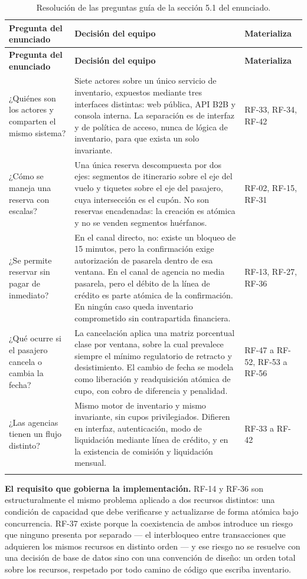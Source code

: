 \documentclass[10pt,letterpaper]{article}
\newcommand{\nota}[1]{%
  \begin{tcolorbox}[colback=cajaFondo,colframe=usaAzul!60,sharp corners=south]#1\end{tcolorbox}}
\begin{document}
\begin{longtable}{@{}L{5.4cm} L{8.4cm} L{2.6cm}@{}}
\toprule \textbf{Pregunta del enunciado} & \textbf{Decisión del equipo} & \textbf{Materializa} \\ \midrule \endfirsthead
\toprule \textbf{Pregunta del enunciado} & \textbf{Decisión del equipo} & \textbf{Materializa} \\ \midrule \endhead
¿Quiénes son los actores y comparten el mismo sistema? & Siete actores sobre un único servicio de inventario, expuestos mediante tres interfaces distintas: web pública, API B2B y consola interna. La separación es de interfaz y de política de acceso, nunca de lógica de inventario, para que exista un solo invariante. & RF-33, RF-34, RF-42 \\
¿Cómo se maneja una reserva con escalas? & Una única reserva descompuesta por dos ejes: segmentos de itinerario sobre el eje del vuelo y tiquetes sobre el eje del pasajero, cuya intersección es el cupón. No son reservas encadenadas: la creación es atómica y no se venden segmentos huérfanos. & RF-02, RF-15, RF-31 \\
¿Se permite reservar sin pagar de inmediato? & En el canal directo, no: existe un bloqueo de 15 minutos, pero la confirmación exige autorización de pasarela dentro de esa ventana. En el canal de agencia no media pasarela, pero el débito de la línea de crédito es parte atómica de la confirmación. En ningún caso queda inventario comprometido sin contrapartida financiera. & RF-13, RF-27, RF-36 \\
¿Qué ocurre si el pasajero cancela o cambia la fecha? & La cancelación aplica una matriz porcentual clase por ventana, sobre la cual prevalece siempre el mínimo regulatorio de retracto y desistimiento. El cambio de fecha se modela como liberación y readquisición atómica de cupo, con cobro de diferencia y penalidad. & RF-47 a RF-52, RF-53 a RF-56 \\
¿Las agencias tienen un flujo distinto? & Mismo motor de inventario y mismo invariante, sin cupos privilegiados. Difieren en interfaz, autenticación, modo de liquidación mediante línea de crédito, y en la existencia de comisión y liquidación mensual. & RF-33 a RF-42 \\
\bottomrule
\caption{Resolución de las preguntas guía de la sección 5.1 del enunciado.}
\end{longtable}

\nota{\textbf{El requisito que gobierna la implementación.} RF-14 y RF-36 son estructuralmente el mismo problema aplicado a dos recursos distintos: una condición de capacidad que debe verificarse y actualizarse de forma atómica bajo concurrencia. RF-37 existe porque la coexistencia de ambos introduce un riesgo que ninguno presenta por separado --- el interbloqueo entre transacciones que adquieren los mismos recursos en distinto orden --- y ese riesgo no se resuelve con una decisión de base de datos sino con una convención de diseño: un orden total sobre los recursos, respetado por todo camino de código que escriba inventario.}
\end{document}
